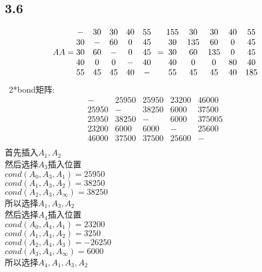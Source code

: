\documentclass{article}
\begin{document}
	\begin{CJK}{UTF8}{gbsn}
	\section*{3.6}
	\begin{equation*}
	AA=\begin{matrix}
	-&30&30&40&55\\
	30&-&60&0&45\\
	30&60&-&0&45\\
	40&0&0&-&40\\
	55&45&45&40&-\\
	\end{matrix}\\
	=\begin{matrix}
	155&30&30&40&55\\
	30&135&60&0&45\\
	30&60&135&0&45\\
	40&0&0&80&40\\
	55&45&45&40&185\\
	\end{matrix}
	\end{equation*}\
	2*bond矩阵:\\
	\begin{equation*}
	\begin{matrix}
		-&25950&25950&23200&46000\\
		25950&-&38250&6000&37500\\
		25950&38250&-&6000&375005\\
		23200&6000&6000&-&25600\\
		46000&37500&37500&25600&-\\
	\end{matrix}
	\end{equation*}
	首先插入$A_1,A_2$\\
	然后选择$A_3$插入位置\\
	$cond(A_0,A_3,A_1)=25950$\\
	$cond(A_1,A_3,A_2)=38250$\\
	$cond(A_2,A_3,A_\infty)=38250$\\
	所以选择$A_1,A_3,A_2$\\
	然后选择$A_4$插入位置\\
	$cond(A_0,A_4,A_1)=23200$\\
	$cond(A_1,A_4,A_2)=3250$\\
	$cond(A_2,A_4,A_3)=-26250$\\
	$cond(A_3,A_4,A_\infty)=6000$\\
	所以选择$A_4,A_1,A_3,A_2$\\

\end{CJK}
\end{document}
